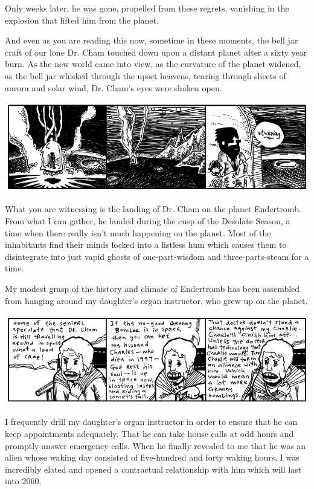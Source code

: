 \documentclass[10pt,twoside]{report}
\begin{document}
Only weeks later, he was gone, propelled from these regrets, vanishing
in the explosion that lifted him from the planet.

And even as you are reading this now, sometime in these moments, the
bell jar craft of our lone Dr. Cham touched down upon a distant planet
after a sixty year burn.  As the new world came into view, as the
curvature of the planet widened, as the bell jar whisked through the
upset heavens, tearing through sheets of aurora and solar wind,
Dr. Cham's eyes were shaken open.

	\includegraphics[width=1.0\textwidth]{cache/35.png}

What you are witnessing is the landing of Dr. Cham on the planet
Endertromb.  From what I can gather, he landed during the cusp of the
Desolate Season, a time when there really isn't much happening on the
planet.  Most of the inhabitants find their minds locked into a
listless hum which causes them to disintegrate into just vapid ghosts
of one-part-wisdom and three-parts-steam for a time.

My modest grasp of the history and climate of Endertromb has been
assembled from hanging around my daughter's organ instructor, who grew
up on the planet.

	\includegraphics[width=1.0\textwidth]{cache/36.png}

I frequently drill my daughter's organ instructor in order to ensure
that he can keep appointments adequately.  That he can take house
calls at odd hours and promptly answer emergency calls. When he
finally revealed to me that he was an alien whose waking day consisted
of five-hundred and forty waking hours, I was incredibly elated and
opened a contractual relationship with him which will last into 2060.
\end{document}
